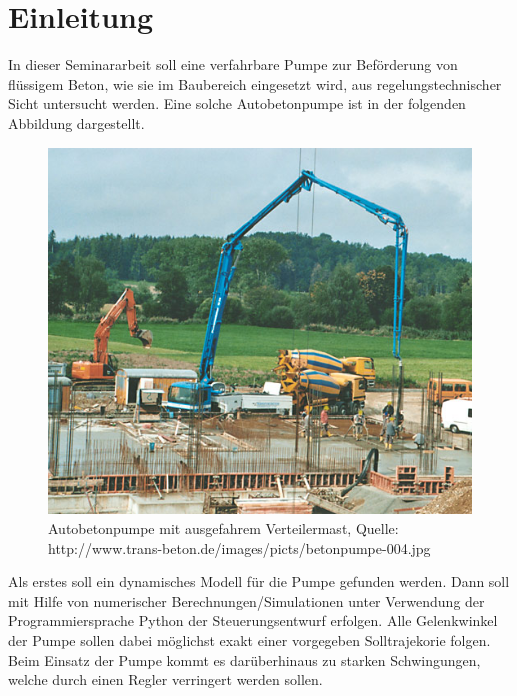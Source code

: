 \chapter{Einleitung}
In dieser Seminararbeit soll eine verfahrbare Pumpe zur Beförderung von flüssigem Beton, wie sie im Baubereich eingesetzt wird, aus regelungstechnischer Sicht untersucht werden. Eine solche Autobetonpumpe ist in der folgenden Abbildung dargestellt. 

\begin{figure}[h!]
\centering
\includegraphics[scale=0.75]{betonpumpe-004.jpg}
\caption[]{Autobetonpumpe mit ausgefahrem Verteilermast, Quelle: \\http://www.trans-beton.de/images/picts/betonpumpe-004.jpg}
\end{figure}

Als erstes soll ein dynamisches Modell für die Pumpe gefunden werden. Dann soll mit Hilfe von numerischer Berechnungen/Simulationen unter Verwendung der Programmiersprache Python der Steuerungsentwurf erfolgen. Alle Gelenkwinkel der Pumpe sollen dabei möglichst exakt einer vorgegeben Solltrajekorie folgen.
Beim Einsatz der Pumpe kommt es darüberhinaus zu starken Schwingungen, welche durch einen Regler verringert werden sollen.



